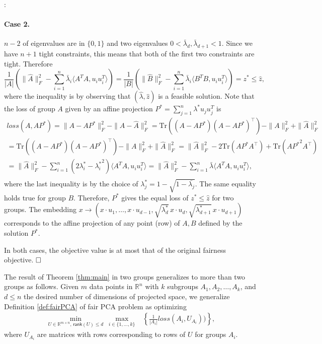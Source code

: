 \documentclass{article}
\newenvironment{proofof}[1]{\smallskip\noindent{\bf Proof of #1}:}{$\hfill \Box$\\}
\newcommand{\rank}{\mathsf{rank}}
\newcommand{\R}{\mathbb{R}}
\begin{document}
\begin{proofof}{Theorem~\ref{thm:main}}
\paragraph{Case 2.} $n-2$ of eigenvalues are in $\{0,1\}$ and two
  eigenvalues $ 0 < \bar{\lambda}_d, \bar{\lambda}_{d+1} < 1$. Since
  we have $n+1$ tight constraints, this means that both of the first two
  constraints are tight. Therefore
  \vspace{-2mm}
  $$
  \frac{1}{|A|}(\|\widehat{A}\|_F^2 - \sum_{i=1}^{n}\bar{\lambda}_i
  \langle {A^TA,u_i u_i^T} \rangle ) =
  \frac{1}{|B|}(\|\widehat{B}\|_F^2 - \sum_{i=1}^{n}\bar{\lambda}_i
  \langle {B^TB,u_i u_i^T} \rangle)=z^*\leq \hat{z},
  $$
  where the inequality is by observing that \((\hat{\lambda},\hat{z})\) is a feasible solution.  Note that the loss of group \(A\) given by an affine projection \(P^*= \sum_{j=1}^n \lambda^* u_j u_j^T\) is
\begin{align*}
loss(A,AP^*)  = \|{A-AP^*}\|_F^2 - \|A- \widehat{A}\|^2_F = \text{Tr}\left((A-AP^*)(A-AP^*)^\top \right) - \|{A}\|_F^2 +\| \widehat{A}\|_F^2 \\
= \text{Tr}\left((A-AP^*)(A-AP^*)^\top \right) - \|{A}\|_F^2 +\| \widehat{A}\|_F^2 = \| \widehat{A}\|_F^2 - 2\text{Tr}(AP^*A^\top)+\text{Tr}(A{P^*}^2A^\top)\\
=\|\widehat{A}\|_F^2 - \sum_{i=1}^{n}(2\lambda_i^* -{\lambda_i^*}^2)\langle {A^TA,u_i u_i^T} \rangle =\|\widehat{A}\|_F^2 - \sum_{i=1}^{n}\bar{\lambda}\langle {A^TA,u_i u_i^T} \rangle  , \\
\end{align*}
where the last inequality is by the choice of \(\lambda_j^* = 1-\sqrt{1-\bar{\lambda_j}}\). The same equality holds true for group \(B\). Therefore, \(P^*\) gives the equal loss of \(z^*\leq\hat{z}\) for two groups.
The embedding
$x \rightarrow (x\cdot u_1, \ldots, x\cdot u_{d-1}, \sqrt{\lambda_d^*}\, x\cdot u_d, \sqrt{\lambda_{d+1}^*} \, x \cdot u_{d+1})
$
corresponds to the affine projection of any point (row) of $A,B$ defined by the solution $P^*$.

In both cases, the objective value is at most that of the original fairness objective.
\end{proofof}

The result of Theorem  \ref{thm:main} in two groups generalizes to more than two groups as follows.
Given $m$ data points in $\mathbb{R}^n$ with \(k\) subgroups $A_1,A_2,\ldots,A_k$, and \(d\leq n \) the desired number of dimensions of projected space, we generalize Definition \ref{def:fairPCA} of fair PCA
  problem  as
  optimizing
 \begin{align}
 \label{minimization}
        \min_{U\in \R^{m\times n} \text{, } \rank(U) \leq  d} \ \max_{i\in\{1,\ldots,k\}}  & \left\{ \frac{1}{|A_i|} loss(A_i,U_{A_i}))\right\},
 \end{align}
 where $U_{A_i}$ are  matrices with rows corresponding to rows of
 $U$ for groups $A_i$.
\end{document}

